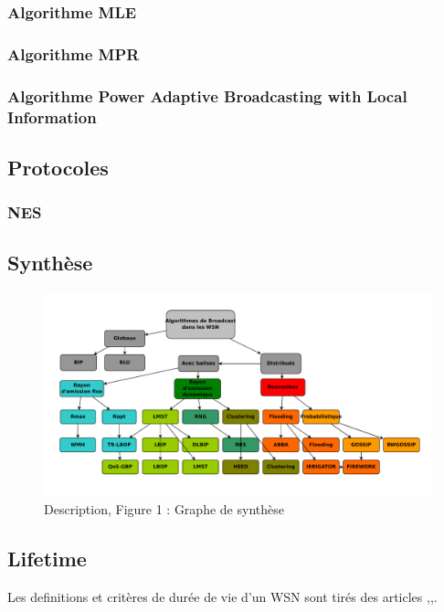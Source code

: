 \subsubsection{Algorithme MLE}
\cite{Cheng2006}
\subsubsection{Algorithme MPR}

\subsubsection{Algorithme Power Adaptive Broadcasting with Local Information}
\cite{Chen2003}



\subsection{Protocoles}
\subsubsection{NES}

\newpage
\subsection{Synthèse}



\newpage

\begin{figure}[H]
\centering
\includegraphics[scale=1,angle=90]{Etat_de_l'art/source/classification}
\caption{Description, Figure 1 : Graphe de synthèse}
\end{figure} 

\subsection{Lifetime}
Les definitions et critères de durée de vie d'un WSN sont tirés des articles \cite{Dietrich2009},\cite{Baert06},\cite{Elleithy11}.


